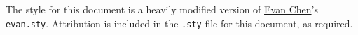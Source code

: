 \documentclass{scrartcl}
\begin{document}
\maketitle
\begin{foreword}
    The style for this document is a heavily modified version of \href{https://github.com/vEnhance}{Evan Chen}'s \texttt{evan.sty}. Attribution is included in the \texttt{.sty} file for this document, as required. 
\end{foreword}
\tableofcontents

\newpage
\setcounter{page}{1} %










\end{document}
